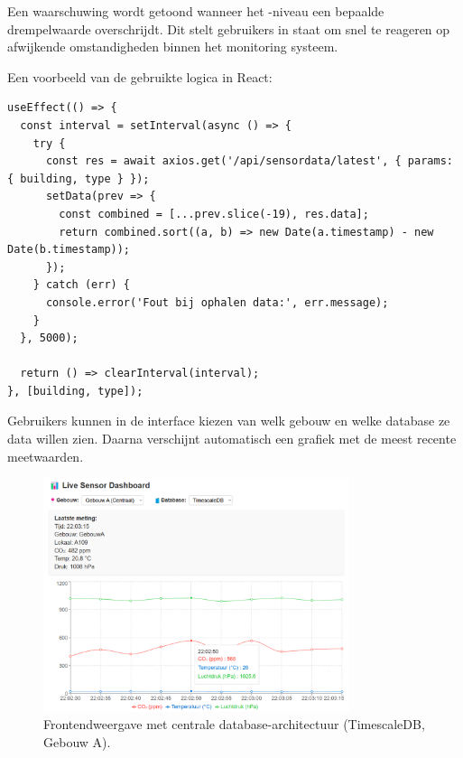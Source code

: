 Een waarschuwing wordt getoond wanneer het -niveau een bepaalde drempelwaarde overschrijdt. Dit stelt gebruikers in staat om snel te reageren op afwijkende omstandigheden binnen het monitoring systeem.

Een voorbeeld van de gebruikte logica in React:

\begin{verbatim}
useEffect(() => {
  const interval = setInterval(async () => {
    try {
      const res = await axios.get('/api/sensordata/latest', { params: { building, type } });
      setData(prev => {
        const combined = [...prev.slice(-19), res.data];
        return combined.sort((a, b) => new Date(a.timestamp) - new Date(b.timestamp));
      });
    } catch (err) {
      console.error('Fout bij ophalen data:', err.message);
    }
  }, 5000);

  return () => clearInterval(interval);
}, [building, type]);
\end{verbatim}

Gebruikers kunnen in de interface kiezen van welk gebouw en welke database ze data willen zien. 
 Daarna verschijnt automatisch een grafiek met de meest recente meetwaarden.

\begin{figure}[H]
	\centering
	\includegraphics[width=0.8\textwidth]{GebouwA_TimeScale_Website.png}
	\caption{Frontendweergave met centrale database-architectuur (TimescaleDB, Gebouw A).}
    \label{fig:gebouw-a-architecture}
\end{figure}

